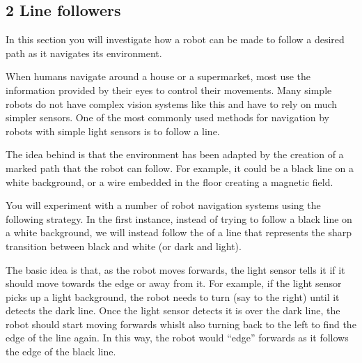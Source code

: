 \documentclass[letterpaper,10pt,english]{sphinxmanual}
\begin{document}
{\begin{itemize}
\end{itemize}





\subsection{2 Line followers}
\label{\detokenize{content/04_Robot_Lab/Section_00_02:2-Line-followers}}\label{\detokenize{content/04_Robot_Lab/Section_00_02::doc}}
In this section you will investigate how a robot can be made to follow a desired path as it navigates its environment.

When humans navigate around a house or a supermarket, most use the information provided by their eyes to control their movements. Many simple robots do not have complex vision systems like this and have to rely on much simpler sensors. One of the most commonly used methods for navigation by robots with simple light sensors is to follow a line.

The idea behind  is that the environment has been adapted by the creation of a marked path that the robot can follow. For example, it could be a black line on a white background, or a wire embedded in the floor creating a magnetic field.

You will experiment with a number of robot navigation systems using the following strategy. In the first instance, instead of trying to follow a black line on a white background, we will instead follow the  of a line that represents the sharp transition between black and white (or dark and light).

The basic idea is that, as the robot moves forwards, the light sensor tells it if it should move towards the edge or away from it. For example, if the light sensor picks up a light background, the robot needs to turn (say to the right) until it detects the dark line. Once the light sensor detects it is over the dark line, the robot should start moving forwards whislt also turning back to the left to find the edge of the line again. In this way, the robot would “edge” forwards as it follows the
 edge of the black line.

}
\end{document}
